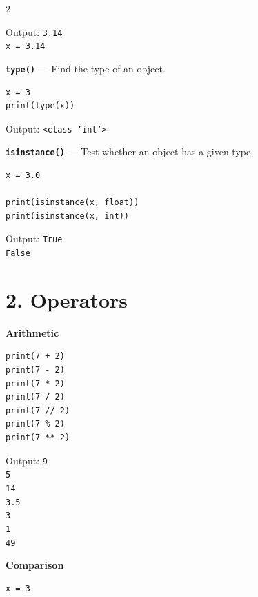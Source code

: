 \documentclass[10pt,a4paper]{article}
\begin{document}
\begin{multicols}{2}
\begin{card}
Output:
\texttt{3.14}\\
\texttt{x = 3.14}
\end{card}

\begin{card}
\textbf{\texttt{type()}} --- Find the type of an object.

\begin{lstlisting}[style=pythonstyle]
x = 3
print(type(x))
\end{lstlisting}

Output:
\texttt{<class 'int'>}
\end{card}

\begin{card}
\textbf{\texttt{isinstance()}} --- Test whether an object has a given type.

\begin{lstlisting}[style=pythonstyle]
x = 3.0

print(isinstance(x, float))
print(isinstance(x, int))
\end{lstlisting}

Output:
\texttt{True}\\
\texttt{False}
\end{card}

\section*{2. Operators}

\begin{card}
\textbf{Arithmetic}

\begin{lstlisting}[style=pythonstyle]
print(7 + 2)
print(7 - 2)
print(7 * 2)
print(7 / 2)
print(7 // 2)
print(7 % 2)
print(7 ** 2)
\end{lstlisting}

Output:
\texttt{9}\\
\texttt{5}\\
\texttt{14}\\
\texttt{3.5}\\
\texttt{3}\\
\texttt{1}\\
\texttt{49}
\end{card}

\begin{card}
\textbf{Comparison}

\begin{lstlisting}[style=pythonstyle]
x = 3


\end{lstlisting}
\end{card}
\end{multicols}
\end{document}
